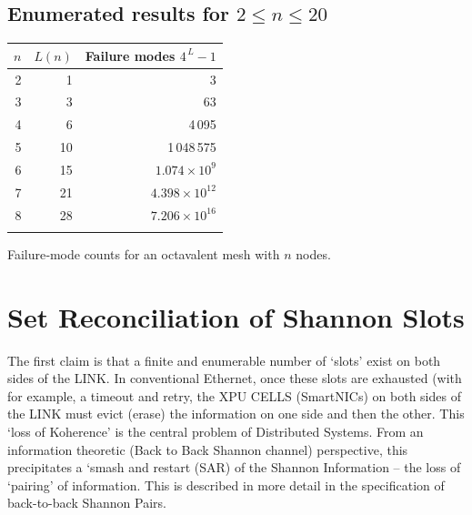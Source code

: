 \documentclass[../OAE-SPEC-MAIN.tex]{subfiles}
\begin{document}
\subsection{Enumerated results for \(2\le n\le20\)}

\begin{margintable}
\centering
\begin{tabular}{@{}rrr@{}}
\toprule
\(n\) & \(L(n)\) & Failure modes \(4^{\,L}-1\)\\
\midrule
 2 &  1 & 3\\
 3 &  3 & 63\\
 4 &  6 & 4\,095\\
 5 & 10 & 1\,048\,575\\
 6 & 15 & \(1.074\times10^{9}\)\\
 7 & 21 & \(4.398\times10^{12}\)\\
 8 & 28 & \(7.206\times10^{16}\)\\
\bottomrule
\vspace{8pt}
\end{tabular}
\caption{Failure‑mode counts for an octavalent mesh with \(n\) nodes.}
\vspace{12pt}
\end{margintable}

\section{Set Reconciliation of Shannon Slots}

The first claim is that a finite and enumerable number of  `slots' exist on both sides of the LINK. In conventional Ethernet, once these slots are exhausted (with for example, a timeout and retry, the XPU CELLS (SmartNICs) on both sides of the LINK must evict (erase) the information on one side and then the other. This `loss of Koherence' is the central problem of Distributed Systems.  From an information theoretic (Back to Back Shannon channel) perspective, this precipitates a `smash and restart (SAR) of the Shannon Information --  the loss of `pairing' of information. This is described in more detail in the specification of back-to-back Shannon Pairs.
\end{document}
